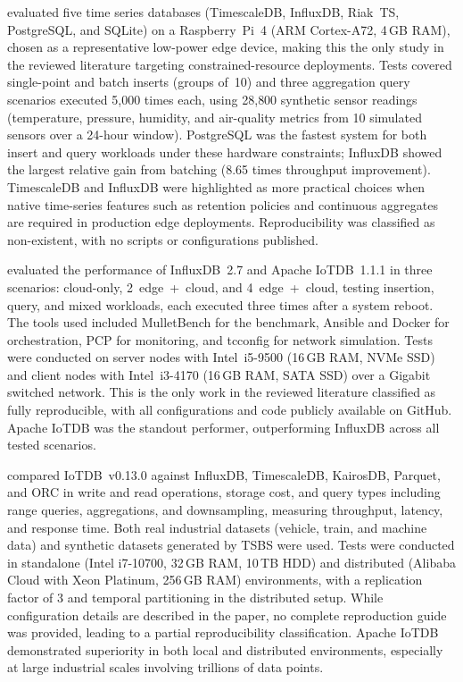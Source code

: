 \cite{grzesik2020comparative} evaluated five time series databases (TimescaleDB, InfluxDB,
Riak~TS, PostgreSQL, and SQLite) on a Raspberry~Pi~4 (ARM Cortex-A72, 4\,GB RAM), chosen
as a representative low-power edge device, making this the only study in the reviewed
literature targeting constrained-resource deployments. Tests covered single-point and batch
inserts (groups of~10) and three aggregation query scenarios executed 5{,}000 times each,
using 28{,}800 synthetic sensor readings (temperature, pressure, humidity, and air-quality
metrics from 10 simulated sensors over a 24-hour window). PostgreSQL was the fastest system
for both insert and query workloads under these hardware constraints; InfluxDB showed the
largest relative gain from batching (8.65 times throughput improvement). TimescaleDB and
InfluxDB were highlighted as more practical choices when native time-series features such as
retention policies and continuous aggregates are required in production edge deployments.
Reproducibility was classified as non-existent, with no scripts or configurations published.

\cite{pereira2023mulletbench} evaluated the performance of InfluxDB~2.7 and Apache IoTDB~1.1.1
in three scenarios: cloud-only, 2~edge~+~cloud, and 4~edge~+~cloud, testing insertion,
query, and mixed workloads, each executed three times after a system reboot. The tools used
included MulletBench for the benchmark, Ansible and Docker for orchestration, PCP for
monitoring, and tcconfig for network simulation. Tests were conducted on server nodes with
Intel~i5-9500 (16\,GB RAM, NVMe SSD) and client nodes with Intel~i3-4170 (16\,GB RAM,
SATA SSD) over a Gigabit switched network. This is the only work in the reviewed literature
classified as fully reproducible, with all configurations and code publicly available on GitHub.
Apache IoTDB was the standout performer, outperforming InfluxDB across all tested scenarios.

\cite{wang2023iotdb} compared IoTDB~v0.13.0 against InfluxDB, TimescaleDB, KairosDB, Parquet,
and ORC in write and read operations, storage cost, and query types including range queries,
aggregations, and downsampling, measuring throughput, latency, and response time.
Both real industrial datasets (vehicle, train, and machine data) and synthetic datasets
generated by TSBS were used. Tests were conducted in standalone (Intel i7-10700, 32\,GB RAM,
10\,TB HDD) and distributed (Alibaba Cloud with Xeon Platinum, 256\,GB RAM) environments,
with a replication factor of 3 and temporal partitioning in the distributed setup. While
configuration details are described in the paper, no complete reproduction guide was provided,
leading to a partial reproducibility classification. Apache IoTDB demonstrated superiority
in both local and distributed environments, especially at large industrial scales involving
trillions of data points.

